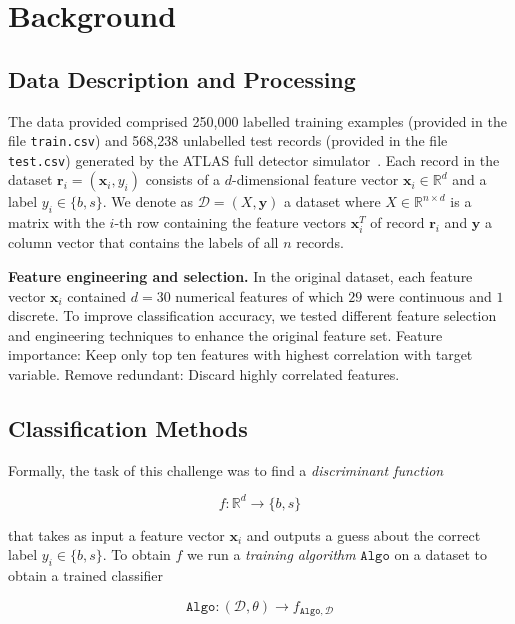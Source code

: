 \documentclass[10pt,conference,compsocconf]{IEEEtran}
\newcommand{\parabf}[1]{\vspace{1mm}\noindent\textbf{#1}}
\newcommand{\Data}{\mathcal{D}}
\newcommand{\features}{\mathbf{x}_i}
\newcommand{\target}{y_i}
\newcommand{\targetset}{\{ b, s \}}
\newcommand{\targetvector}{\mathbf{y}}
\newcommand{\classifier}[2]{f_{#1, #2}}
\newcommand{\Train}{\mathtt{Algo}}
\begin{document}
\section{Background}

\subsection{Data Description and Processing}
\label{sec:data}
The data provided comprised 250,000 labelled training examples (provided in the file \texttt{train.csv}) and 568,238 unlabelled test records (provided in the file \texttt{test.csv}) generated by the ATLAS full detector simulator~\cite{HiggsML}.
Each record in the dataset $\mathbf{r}_i = (\features, \target)$ consists of a $d$-dimensional feature vector $\features \in \mathbb{R}^d$ and a label $\target \in \targetset$. We denote as $\Data = (X, \targetvector)$ a dataset where $X \in \mathbb{R}^{n \times d}$ is a matrix with the $i$-th row containing the feature vectors $\features^T$ of record $\mathbf{r}_i$ and $\targetvector$ a column vector that contains the labels of all $n$ records.       


\parabf{Feature engineering and selection.} In the original dataset, each feature vector $\features$ contained $d=30$ numerical features of which $29$ were continuous and $1$ discrete.
To improve classification accuracy, we tested different feature selection and engineering techniques to enhance the original feature set.
Feature importance: Keep only top ten features with highest correlation with target variable. Remove redundant: Discard highly correlated features.

\subsection{Classification Methods}
Formally, the task of this challenge was to find a \emph{discriminant function}

\begin{equation}
	f: \mathbb{R}^d \rightarrow \targetset
\end{equation}

that takes as input a feature vector $\features$ and outputs a guess about the correct label $\target \in \targetset$. To obtain $f$ we run a \emph{training algorithm} $\Train$ on a dataset to obtain a trained classifier

\begin{equation}
	\Train: (\Data, \theta) \rightarrow \classifier{\Train}{\Data}
\end{equation}
\end{document}
